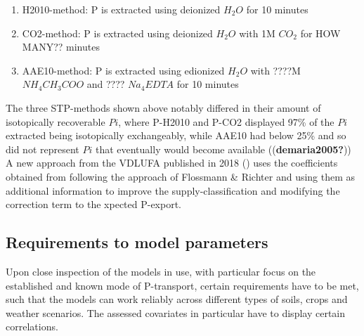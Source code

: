 \documentclass[
  letterpaper,
  DIV=11,
  numbers=noendperiod]{scrartcl}
\providecommand{\tightlist}{%
  \setlength{\itemsep}{0pt}\setlength{\parskip}{0pt}}\usepackage{longtable,booktabs,array}
\begin{document}
\begin{enumerate}
\def\labelenumi{\arabic{enumi}.}
\tightlist
\item
  H2010-method: P is extracted using deionized \(H_2O\) for 10 minutes
\item
  CO2-method: P is extracted using deionized \(H_2O\) with 1M \(CO_2\)
  for HOW MANY?? minutes
\item
  AAE10-method: P is extracted using edionized \(H_2O\) with ????M
  \(NH_4CH_3COO\) and ???? \(Na_4EDTA\) for 10 minutes
\end{enumerate}

The three STP-methods shown above notably differed in their amount of
isotopically recoverable \(Pi\), where P-H2010 and P-CO2 displayed 97\%
of the \(Pi\) extracted being isotopically exchangeably, while AAE10 had
below 25\% and so did not represent \(Pi\) that eventually would become
available ((\textbf{demaria2005?}))\\
A new approach from the VDLUFA published in 2018 () uses the
coefficients obtained from following the approach of Flossmann \&
Richter and using them as additional information to improve the
supply-classification and modifying the correction term to the xpected
P-export.

\subsection{Requirements to model
parameters}\label{requirements-to-model-parameters}

Upon close inspection of the models in use, with particular focus on the
established and known mode of P-transport, certain requirements have to
be met, such that the models can work reliably across different types of
soils, crops and weather scenarios. The assessed covariates in
particular have to display certain correlations.
\end{document}
